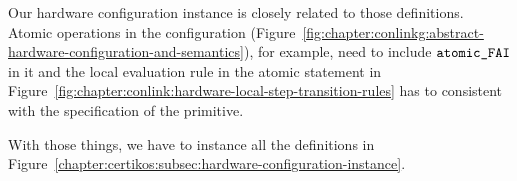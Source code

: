 Our hardware configuration instance is closely related to those definitions. 
Atomic operations in the configuration (Figure~\ref{fig:chapter:conlinkg:abstract-hardware-configuration-and-semantics}), for example,
need to include ${\mathrm{\texttt{atomic\_FAI}}}$  
in it and the local evaluation rule in the atomic statement in Figure~\ref{fig:chapter:conlink:hardware-local-step-transition-rules}  has to 
consistent with the specification of the primitive.
%
%
%

With those things, 
we have to instance all the definitions in Figure~\ref{chapter:certikos:subsec:hardware-configuration-instance}.


